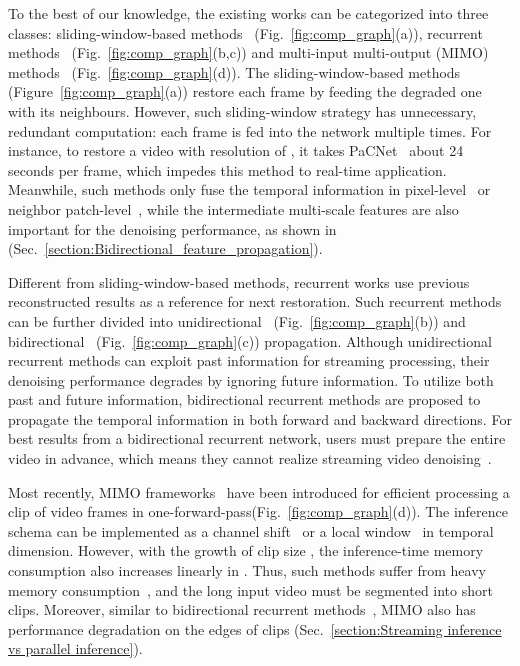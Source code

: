 \documentclass[sigconf]{acmart}
\begin{document}
To the best of our knowledge, the existing works can be categorized into three classes: sliding-window-based methods~\cite{Tassano2020FastDVDNet,Vaksman2021Patch} (Fig.~\ref{fig:comp_graph}(a)), 
recurrent methods~\cite{Maggioni2021Efficient,Xiang2022ReMoNet} (Fig.~\ref{fig:comp_graph}(b,c)) and multi-input multi-output (MIMO) methods~\cite{Xiang2022ReMoNet,liang2022vrt} (Fig.~\ref{fig:comp_graph}(d)).
The sliding-window-based methods~\cite{Tassano2020FastDVDNet,Vaksman2021Patch} (Figure~\ref{fig:comp_graph}(a)) restore each frame by feeding the degraded one with its neighbours. 
However, such sliding-window strategy has unnecessary, redundant computation: each frame is fed into the network multiple times. 
For instance, to restore a video with resolution of , it takes PaCNet~\cite{Vaksman2021Patch} about 24 seconds per frame, which impedes this method to real-time application. 
Meanwhile, such methods only fuse the temporal information in pixel-level~\cite{Tassano2020FastDVDNet} or neighbor patch-level~\cite{Vaksman2021Patch}, while the intermediate multi-scale features are also important for the denoising performance, as shown in (Sec.~\ref{section:Bidirectional_feature_propagation}).


Different from sliding-window-based methods, recurrent works  \cite{Maggioni2021Efficient,chan2021basicvsr} use previous reconstructed results as a reference for next restoration. Such recurrent methods can be further divided into unidirectional~\cite{Maggioni2021Efficient,Xiang2022ReMoNet} (Fig.~\ref{fig:comp_graph}(b)) and bidirectional~\cite{chan2021basicvsr} (Fig.~\ref{fig:comp_graph}(c)) propagation. Although unidirectional recurrent methods can exploit past information for streaming processing, their denoising performance degrades by ignoring future information. To utilize both past and future information, bidirectional recurrent methods are proposed to propagate the temporal information in both forward and backward directions. For best results from a bidirectional recurrent network, users must prepare the entire video in advance, which means they cannot realize streaming video denoising~\cite{chan2021basicvsr}.

Most recently, MIMO frameworks~\cite{Xiang2022ReMoNet,liang2022vrt} have been introduced for efficient processing a clip of video frames
in one-forward-pass(Fig.~\ref{fig:comp_graph}(d)). The inference schema can be implemented as a channel shift~\cite{Lin2019TSM} or a local window~\cite{liang2022vrt} in temporal dimension. However, with the growth of clip size , the inference-time memory consumption also increases linearly in .
Thus, such methods suffer from heavy memory consumption~\cite{liang2022vrt}, and the long input video must be segmented into short clips.
Moreover, similar to bidirectional recurrent methods~\cite{chan2021basicvsr}, MIMO also has
performance degradation on the edges of clips (Sec.~\ref{section:Streaming inference vs parallel inference}).
\end{document}
